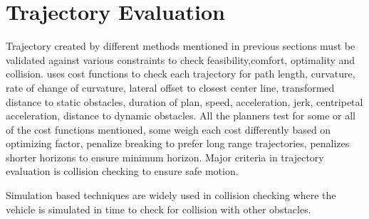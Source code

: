 \section{Trajectory Evaluation}
\label{traj_eval}
Trajectory created by different methods mentioned in previous sections must be validated against various constraints to check feasibility,comfort, optimality and collision. \cite{traj_planner_optimization} uses cost functions to check each trajectory for path length, curvature, rate of change of curvature, lateral offset to closest center line, transformed distance to static obstacles, duration of plan, speed, acceleration, jerk, centripetal acceleration, distance to dynamic obstacles. All the planners test for some or all of the cost functions mentioned, some weigh each cost differently based on optimizing factor, \cite{unit_A_star} penalize breaking to prefer long range trajectories, \cite{cmu_parallel_thesis} penalizes shorter horizons to ensure minimum horizon. Major criteria in trajectory evaluation is collision checking to ensure safe motion. 

Simulation based techniques are widely used in collision checking where the vehicle is simulated in time to check for collision with other obstacles.

